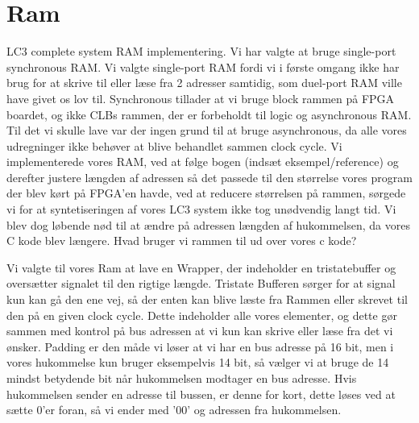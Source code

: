 \section{Ram}
 LC3 complete system RAM implementering.
Vi har valgte at bruge single-port synchronous RAM. Vi valgte single-port RAM fordi vi i første omgang ikke har brug for at skrive til eller læse fra 2 adresser samtidig, som duel-port RAM ville have givet os lov til. Synchronous tillader at vi bruge block rammen på FPGA boardet, og ikke CLBs rammen, der er forbeholdt til logic og asynchronous RAM. Til det vi skulle lave var der ingen grund til at bruge asynchronous, da alle vores udregninger ikke behøver at blive behandlet sammen clock cycle. Vi implementerede vores RAM, ved at følge bogen (indsæt eksempel/reference) og derefter justere længden af adressen så det passede til den størrelse vores program der blev kørt på FPGA'en havde, ved at reducere størrelsen på rammen, sørgede vi for at syntetiseringen af vores LC3 system ikke tog unødvendig langt tid. Vi blev dog løbende nød til at ændre på adressen længden af hukommelsen, da vores C kode blev længere. Hvad bruger vi rammen til ud over vores c kode?  

 Vi valgte til vores Ram at lave en Wrapper, der indeholder en tristatebuffer og oversætter signalet til den rigtige længde.
Tristate Bufferen sørger for at signal kun kan gå den ene vej, så der enten kan blive læste fra Rammen eller skrevet til den på en given clock cycle. Dette indeholder alle vores elementer, og dette gør sammen med kontrol på bus adressen at vi kun kan skrive eller læse fra det vi ønsker.
Padding er den måde vi løser at vi har en bus adresse på 16 bit, men i vores hukommelse kun bruger eksempelvis 14 bit, så vælger vi at bruge de 14 mindst betydende bit når hukommelsen modtager en bus adresse. Hvis hukommelsen sender en adresse til bussen, er denne for kort, dette løses ved at sætte 0'er foran, så vi ender med '00' og adressen fra hukommelsen.